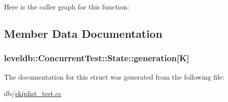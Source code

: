 Here is the caller graph for this function\-:




\subsection{Member Data Documentation}
\hypertarget{structleveldb_1_1_concurrent_test_1_1_state_aa9ffe50e1ae5b818b89aa8de547c9ddd}{
\subsubsection[{generation}]{ leveldb\-::\-Concurrent\-Test\-::\-State\-::generation\mbox{[}{\bf K}\mbox{]}}}\label{structleveldb_1_1_concurrent_test_1_1_state_aa9ffe50e1ae5b818b89aa8de547c9ddd}


The documentation for this struct was generated from the following file\-:\begin{DoxyCompactItemize}
\item 
db/\hyperlink{skiplist__test_8cc}{skiplist\-\_\-test.\-cc}\end{DoxyCompactItemize}
